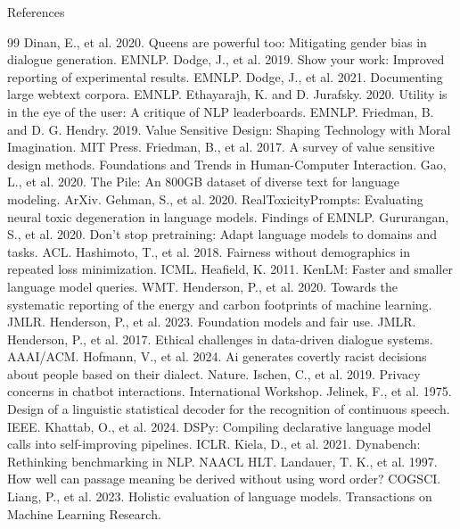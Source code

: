 \documentclass[aspectratio=169]{beamer}
\begin{document}
\begin{frame}[allowframebreaks]{References}
\begin{thebibliography}{99}
     Dinan, E., et al. 2020. Queens are powerful too: Mitigating gender bias in dialogue generation. EMNLP.
     Dodge, J., et al. 2019. Show your work: Improved reporting of experimental results. EMNLP.
     Dodge, J., et al. 2021. Documenting large webtext corpora. EMNLP.
     Ethayarajh, K. and D. Jurafsky. 2020. Utility is in the eye of the user: A critique of NLP leaderboards. EMNLP.
     Friedman, B. and D. G. Hendry. 2019. Value Sensitive Design: Shaping Technology with Moral Imagination. MIT Press.
     Friedman, B., et al. 2017. A survey of value sensitive design methods. Foundations and Trends in Human-Computer Interaction.
     Gao, L., et al. 2020. The Pile: An 800GB dataset of diverse text for language modeling. ArXiv.
     Gehman, S., et al. 2020. RealToxicityPrompts: Evaluating neural toxic degeneration in language models. Findings of EMNLP.
     Gururangan, S., et al. 2020. Don’t stop pretraining: Adapt language models to domains and tasks. ACL.
     Hashimoto, T., et al. 2018. Fairness without demographics in repeated loss minimization. ICML.
     Heafield, K. 2011. KenLM: Faster and smaller language model queries. WMT.
     Henderson, P., et al. 2020. Towards the systematic reporting of the energy and carbon footprints of machine learning. JMLR.
     Henderson, P., et al. 2023. Foundation models and fair use. JMLR.
     Henderson, P., et al. 2017. Ethical challenges in data-driven dialogue systems. AAAI/ACM.
     Hofmann, V., et al. 2024. Ai generates covertly racist decisions about people based on their dialect. Nature.
     Ischen, C., et al. 2019. Privacy concerns in chatbot interactions. International Workshop.
     Jelinek, F., et al. 1975. Design of a linguistic statistical decoder for the recognition of continuous speech. IEEE.
     Khattab, O., et al. 2024. DSPy: Compiling declarative language model calls into self-improving pipelines. ICLR.
     Kiela, D., et al. 2021. Dynabench: Rethinking benchmarking in NLP. NAACL HLT.
     Landauer, T. K., et al. 1997. How well can passage meaning be derived without using word order? COGSCI.
     Liang, P., et al. 2023. Holistic evaluation of language models. Transactions on Machine Learning Research.

\end{thebibliography}
\end{frame}
\end{document}
